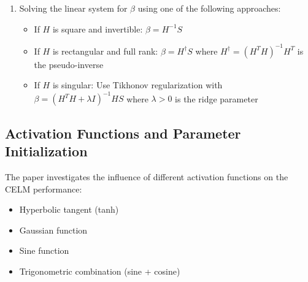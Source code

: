 \documentclass[11pt]{article}
\begin{document}
\begin{enumerate}
    with matrix blocks:
    \begin{itemize}
        \item $H_{12}$ contains second derivatives of activation functions evaluated at interior points: $\sigma''(V_i(x_I^q))$
        \item $H_{21}$ contains second derivatives of activation functions: $\sigma''(U_j(x_I^q))$
        \item $H_{22}$ contains activation function values: $\sigma(V_i(x_I^q))$
        \item $H_{31}$ contains activation function values at boundary points: $\sigma(U_j(x_B^p))$
        \item $H_{42}$ contains activation function values at boundary points: $\sigma(V_i(x_B^p))$
    \end{itemize}
    
    and right-hand side vectors:
    \begin{itemize}
        \item $S_f = [f(x_I^1), f(x_I^2), \ldots, f(x_I^Q)]^T$
        \item $S_0 = [0, 0, \ldots, 0]^T$ (zero vector of length $Q$)
        \item $S_g = [g(x_B^1), g(x_B^2), \ldots, g(x_B^P)]^T$
        \item $S_h = [h(x_B^1), h(x_B^2), \ldots, h(x_B^P)]^T$
    \end{itemize}
    
    \item Solving the linear system for $\beta$ using one of the following approaches:
    \begin{itemize}
        \item If $H$ is square and invertible: $\beta = H^{-1}S$
        \item If $H$ is rectangular and full rank: $\beta = H^\dagger S$ where $H^\dagger = (H^T H)^{-1}H^T$ is the pseudo-inverse
        \item If $H$ is singular: Use Tikhonov regularization with $\beta = (H^T H + \lambda I)^{-1}HS$ where $\lambda > 0$ is the ridge parameter
    \end{itemize}
\end{enumerate}

\subsection{Activation Functions and Parameter Initialization}

The paper investigates the influence of different activation functions on the CELM performance:
\begin{itemize}
    \item Hyperbolic tangent (tanh)
    \item Gaussian function
    \item Sine function
    \item Trigonometric combination (sine + cosine)
\end{itemize}
\end{document}
